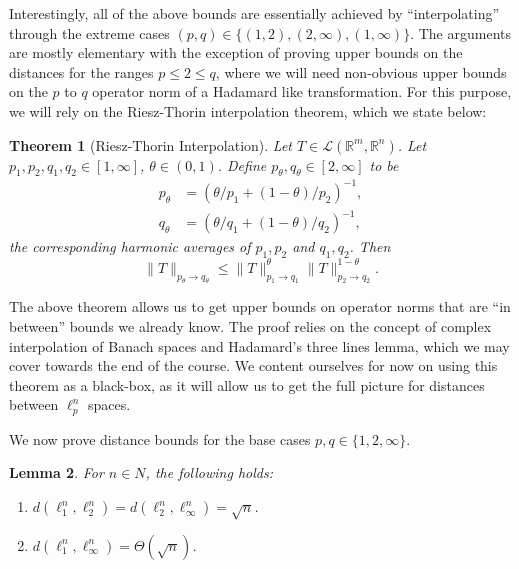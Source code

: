 \documentclass[11pt]{article}
\newtheorem{theorem}{Theorem}
\newtheorem{lemma}[theorem]{Lemma}
\theoremstyle{plain}
\theoremstyle{plain}
\newcommand{\set}[1]{\{{#1}\}}
\newcommand{\R}{\ensuremath{\mathbb{R}}}
\begin{document}
Interestingly, all of the above bounds are essentially achieved by
``interpolating'' through the extreme cases $(p,q) \in
\set{(1,2),(2,\infty),(1,\infty)}$. The arguments are mostly elementary with the
exception of proving upper bounds on the distances for the ranges $p \leq 2 \leq
q$, where we will need non-obvious upper bounds on the $p$ to $q$ operator norm
of a Hadamard like transformation. For this purpose, we will rely on the
Riesz-Thorin interpolation theorem, which we state below:

\begin{theorem}[Riesz-Thorin Interpolation] 
\label{thm:riesz-thorin}
Let $T \in \mathcal{L}(\R^m,\R^n)$.  Let $p_1,p_2,q_1,q_2 \in [1,\infty]$,
$\theta \in (0,1)$. Define $p_\theta,q_\theta \in [2,\infty]$ to be 
\begin{align*}
p_\theta &= (\theta/p_1 + (1-\theta)/p_2)^{-1} ,\\
q_\theta &= (\theta/q_1 + (1-\theta)/q_2)^{-1} ,
\end{align*}
the corresponding harmonic averages of $p_1,p_2$ and $q_1,q_2$. Then
\[
\|T\|_{p_\theta \rightarrow q_\theta} \leq \|T\|_{p_1 \rightarrow
q_1}^{\theta}\|T\|_{p_2 \rightarrow q_2}^{1-\theta}.
\]
\end{theorem} 

The above theorem allows us to get upper bounds on operator norms that are ``in
between'' bounds we already know. The proof relies on the concept of complex
interpolation of Banach spaces and Hadamard's three lines lemma, which we may
cover towards the end of the course. We content ourselves for now on using this
theorem as a black-box, as it will allow us to get the full picture for
distances between $\ell_p^n$ spaces.


We now prove distance bounds for the base cases $p,q \in \set{1,2,\infty}$.

\begin{lemma}
For $n \in N$, the following holds:
\begin{enumerate}
\item $d(\ell_1^n,\ell_2^n) = d(\ell_2^n,\ell_\infty^n) = \sqrt{n}$.
\item $d(\ell_1^n,\ell_\infty^n) = \Theta(\sqrt{n})$.
\end{enumerate}
\label{lem:base-cases}
\end{lemma}
\end{document}
